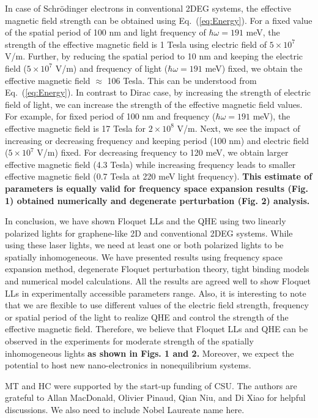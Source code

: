 \documentclass[aps,prl,showpacs,twocolumn,amsmath,amssymb,superscriptaddress]{revtex4-2}
\begin{document}
In case of Schr\"{o}dinger electrons in conventional 2DEG systems, the effective magnetic field strength can be obtained using Eq.~(\ref{eq:Energy}). For a fixed value of the spatial period of 100 nm and light frequency of $\hbar \omega = 191$ meV, the strength of the effective magnetic field is 1 Tesla using electric field of $5 \times 10^7$ V/m. Further, by reducing the spatial period to 10 nm and keeping the electric field ($5 \times 10^7$ V/m) and frequency of light ($\hbar \omega = 191 $ meV) fixed, we obtain the effective magnetic field $\approx$ 106 Tesla. This can be understood from Eq.~(\ref{eq:Energy}). In contrast to Dirac case, by increasing the strength of electric field of light, we can increase the strength of the effective magnetic field values. For example, for fixed period of 100 nm and frequency ($\hbar \omega = 191 $ meV), the effective magnetic field is 17 Tesla for $2 \times 10^8$ V/m. Next, we see the impact of increasing or decreasing frequency and keeping period (100 nm) and electric field ($5 \times 10^7$ V/m) fixed. For decreasing frequency to 120 meV, we obtain larger effective magnetic field (4.3 Tesla) while increasing frequency leads to smaller effective magnetic field (0.7 Tesla at 220 meV light frequency). \textbf{This estimate of parameters is equally valid for frequency space expansion results (Fig. 1) obtained numerically and degenerate perturbation (Fig. 2) analysis.}

In conclusion, we have shown Floquet LLs and the QHE using two linearly polarized lights for graphene-like 2D and conventional 2DEG systems. While using these laser lights, we  need at least one or both polarized lights to be spatially inhomogeneous. We have presented results using frequency space expansion method, degenerate Floquet perturbation theory, tight binding models and numerical model calculations. All the results are agreed well to show Floquet LLs in experimentally accessible parameters range. Also, it is interesting to note that we are flexible to use different values of the electric field strength, frequency or spatial period of the light to realize QHE and control the strength of the effective magnetic field. Therefore, we believe that Floquet LLs and QHE can be observed in the experiments for moderate strength of the spatially inhomogeneous lights \textbf{as shown in Figs. 1 and 2.} Moreover, we expect the potential to host new nano-electronics in nonequilibrium systems.

\begin{acknowledgments}
MT and HC were supported by the start-up funding of CSU. The authors are grateful to Allan MacDonald, Olivier Pinaud, Qian Niu, and Di Xiao for helpful discussions. We also need to include Nobel Laureate name here.
\end{acknowledgments}


\end{document}
